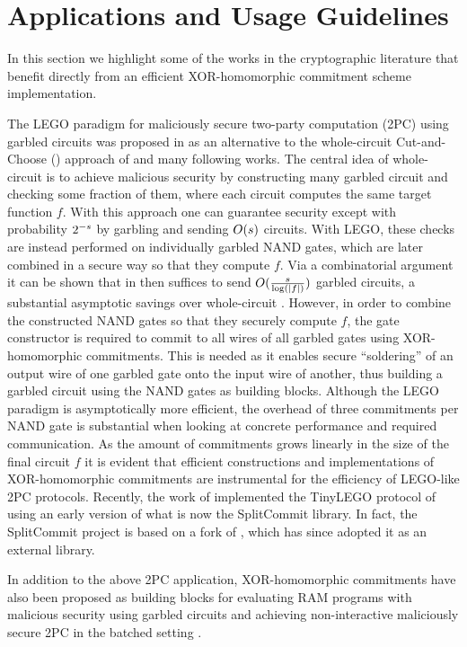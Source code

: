 
\section{Applications and Usage Guidelines}
In this section we highlight some of the works in the cryptographic literature that benefit directly from an efficient XOR-homomorphic commitment scheme implementation.

The LEGO paradigm for maliciously secure two-party computation (2PC) using garbled circuits was proposed in \cite{DBLP:conf/tcc/NielsenO09} as an alternative to the whole-circuit Cut-and-Choose (\CC) approach of \cite{DBLP:conf/eurocrypt/LindellP07} and many following works. The central idea of whole-circuit \CC is to achieve malicious security by constructing many garbled circuit and checking some fraction of them, where each circuit computes the same target function $f$. With this approach one can guarantee security except with probability $2^{-s}$ by garbling and sending $O(s)$ circuits. With LEGO, these checks are instead performed on individually garbled NAND gates, which are later combined in a secure way so that they compute $f$. Via a combinatorial argument it can be shown that in then suffices to send $O(\frac{s}{\log(|f|)})$ garbled circuits, a substantial asymptotic savings over whole-circuit \CC. However, in order to combine the constructed NAND gates so that they securely compute $f$, the gate constructor is required to commit to all wires of all garbled gates using XOR-homomorphic commitments. This is needed as it enables secure ``soldering'' of an output wire of one garbled gate onto the input wire of another, thus building a garbled circuit using the NAND gates as building blocks. Although the LEGO paradigm is asymptotically more efficient, the overhead of three commitments per NAND gate is substantial when looking at concrete performance and required communication. As the amount of commitments grows linearly in the size of the final circuit $f$ it is evident that efficient constructions and implementations of XOR-homomorphic commitments are instrumental for the efficiency of LEGO-like 2PC protocols. Recently, the work of \cite{NST17} implemented the TinyLEGO protocol of \cite{DBLP:journals/iacr/FrederiksenJNT15} using an early version of what is now the SplitCommit library. In fact, the SplitCommit project is based on a fork of \cite{NST17}, which has since adopted it as an external library.

In addition to the above 2PC application, XOR-homomorphic commitments have also been proposed as building blocks for evaluating RAM programs with malicious security using garbled circuits \cite{DBLP:conf/eurocrypt/AfsharHMR15} and achieving non-interactive maliciously secure 2PC in the batched setting \cite{DBLP:journals/iacr/MohasselR17}.